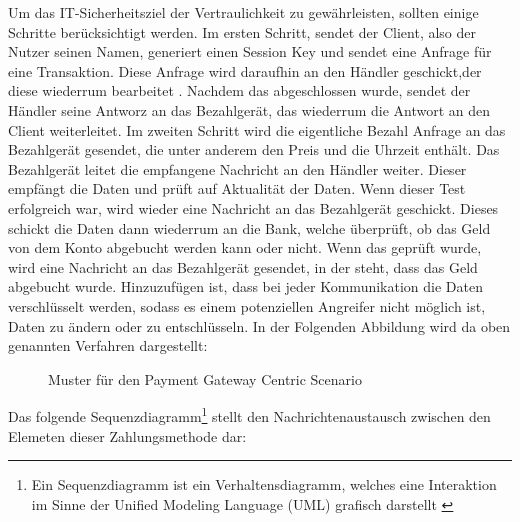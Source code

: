 Um das IT-Sicherheitsziel der Vertraulichkeit zu gewährleisten, sollten einige Schritte berücksichtigt
werden. Im ersten Schritt, sendet der Client, also der Nutzer seinen Namen, generiert einen Session Key 
und sendet eine Anfrage für eine Transaktion. Diese Anfrage wird daraufhin an den Händler
geschickt,der diese wiederrum bearbeitet \cite{refart:JTAS}. Nachdem das abgeschlossen wurde, sendet der Händler 
seine Antworz an das Bezahlgerät, das wiederrum die Antwort an den Client weiterleitet. Im zweiten Schritt wird die 
eigentliche Bezahl Anfrage an das Bezahlgerät gesendet, die unter anderem den Preis und die Uhrzeit enthält.
Das Bezahlgerät leitet die empfangene Nachricht an den Händler weiter. Dieser empfängt die Daten und 
prüft auf Aktualität der Daten. Wenn dieser Test erfolgreich war, wird wieder eine Nachricht an das 
Bezahlgerät geschickt. Dieses schickt die Daten dann wiederrum an die Bank, welche überprüft, ob das
Geld von dem Konto abgebucht werden kann oder nicht. Wenn das geprüft wurde, wird eine Nachricht an
das Bezahlgerät gesendet, in der steht, dass das Geld abgebucht wurde. Hinzuzufügen ist, dass bei jeder
Kommunikation die Daten verschlüsselt werden, sodass es einem potenziellen Angreifer nicht möglich ist,
Daten zu ändern oder zu entschlüsseln. In der Folgenden Abbildung wird da oben genannten Verfahren
dargestellt:

\vfill
\begin{figure}[H]
    \caption{Muster für den Payment Gateway Centric Scenario\cite{refart:JTAS}}
    \label{fig:refart:JTAS}
\end{figure}
\vfill

Das folgende Sequenzdiagramm\footnote{Ein Sequenzdiagramm ist ein Verhaltensdiagramm, welches
eine Interaktion im Sinne der Unified Modeling Language (UML) grafisch darstellt \cite{refbook:IASE}} 
stellt den Nachrichtenaustausch zwischen den Elemeten dieser Zahlungsmethode dar:

